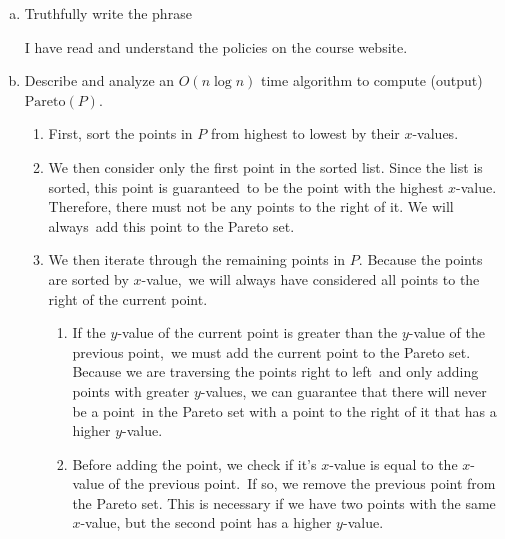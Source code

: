 \documentclass[11pt]{article}
\begin{document}
\begin{enumerate}[(a)]\itemsep0pt
  \item
    Truthfully write the phrase 
    
\begin{solution}
  I have read and understand the policies on the course website.
\end{solution}

  \item
    Describe and analyze an \(O(n \log n)\) time algorithm to compute (output) \(\text{Pareto}(P)\).

\begin{solution}
  \begin{enumerate}
    \item[1.]
      First, sort the points in \(P\) from highest to lowest by their \(x\)-values.
    \item[2.]
      We then consider only the first point in the sorted list. Since the list is sorted, this point is guaranteed\
      to be the point with the highest \(x\)-value. Therefore, there must not be any points to the right of it. We will always\
      add this point to the Pareto set.
    \item[3.]
    We then iterate through the remaining points in \(P\). Because the points are sorted by \(x\)-value,\
    we will always have considered all points to the right of the current point.
      \begin{enumerate}
        \item[i.]
          If the \(y\)-value of the current point is greater than the \(y\)-value of the previous point,\
          we must add the current point to the Pareto set. Because we are traversing the points right to left\
          and only adding points with greater \(y\)-values, we can guarantee that there will never be a point\
          in the Pareto set with a point to the right of it that has a higher \(y\)-value.
        \item[ii.]
          Before adding the point, we check if it's \(x\)-value is equal to the \(x\)-value of the previous point.\
          If so, we remove the previous point from the Pareto set. This is necessary if we have two points with the same\
          \(x\)-value, but the second point has a higher \(y\)-value.
      \end{enumerate}
  \end{enumerate}


\end{solution}
\end{enumerate}
\end{document}
